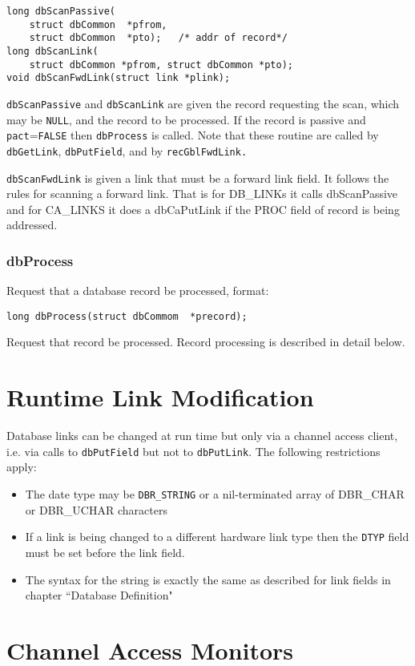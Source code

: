 \begin{verbatim}long dbScanPassive(
    struct dbCommon  *pfrom,
    struct dbCommon  *pto);   /* addr of record*/
long dbScanLink(
    struct dbCommon *pfrom, struct dbCommon *pto);
void dbScanFwdLink(struct link *plink);
\end{verbatim}
 \verb|dbScanPassive| and \verb|dbScanLink| are given the record requesting the scan, which may be \verb|NULL|, and the record to 
be processed. If the record is passive and \verb|pact|=\verb|FALSE| then \verb|dbProcess| is called. Note that these routine are called by 
\verb|dbGetLink|, \verb|dbPutField|, and by \verb|recGblFwdLink.|

\verb|dbScanFwdLink| is given a link that must be a forward link field. It follows the rules for scanning a forward link. That 
is for DB\_LINKs it calls dbScanPassive and for CA\_LINKS it does a dbCaPutLink if the PROC field of record is being 
addressed.

\subsubsection{dbProcess }

Request that a database record be processed, format:

\begin{verbatim}long dbProcess(struct dbCommom  *precord);
\end{verbatim}Request that record be processed. Record processing is described in detail below.

\section{Runtime Link Modification}

Database links can be changed at run time but only via a channel access client, i.e. via calls to \verb|dbPutField| but not to 
\verb|dbPutLink|. The following restrictions apply:

\begin{itemize}\item The date type may be \verb|DBR_STRING| or a nil-terminated array of DBR\_CHAR or DBR\_UCHAR characters

\item If a link is being changed to a different hardware link type then the \verb|DTYP| field must be set before the link field.

\item The syntax for the string is exactly the same as described for link fields in chapter ``Database Definition"

\end{itemize}\section{Channel Access Monitors}

